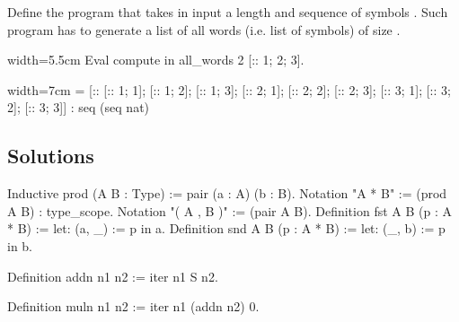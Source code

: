 \begin{Exercise}[label=ex:allwords,difficulty=2,title={All words of size n}]
Define the  program that takes in input a
length  and sequence of symbols .
Such program has to generate a list of all words (i.e. list
of symbols) of size .

\begin{coq}{}{width=5.5cm}
Eval compute in
  all_words 2 [:: 1; 2; 3].
\end{coq}
\begin{coqout}{}{width=7cm}
 = [:: [:: 1; 1]; [:: 1; 2]; [:: 1; 3];
       [:: 2; 1]; [:: 2; 2]; [:: 2; 3];
       [:: 3; 1]; [:: 3; 2]; [:: 3; 3]]
 : seq (seq nat)
\end{coqout}
\end{Exercise}

\subsection{Solutions}

\begin{Answer}[ref=ex:pair]

\begin{coq}{}{}
Inductive prod (A B : Type) := pair (a : A) (b : B).
Notation "A * B" := (prod A B) : type_scope.
Notation "( A , B )" := (pair A B).
Definition fst A B (p : A * B) := let: (a, _) := p in a.
Definition snd A B (p : A * B) := let: (_, b) := p in b.
\end{coq}
\index[coq]{\C{(_ , _)}}

\end{Answer}

\begin{Answer}[ref=ex:iteradd]

\begin{coq}{}{}
Definition addn n1 n2 := iter n1 S n2.
\end{coq}

\end{Answer}

\begin{Answer}[ref=ex:itermul]

\begin{coq}{}{}
Definition muln n1 n2 := iter n1 (addn n2) 0.
\end{coq}

\end{Answer}

